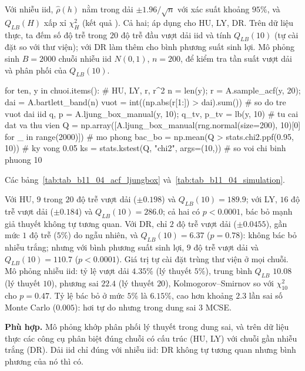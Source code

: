  Với nhiễu iid, $\hat\rho(h)$ nằm trong dải $\pm1.96/\sqrt n$ với xác suất khoảng $95\%$, và $Q_{LB}(H)$ xấp xỉ $\chi^2_H$ (kết quả ).
 Cả hai; áp dụng cho HU, LY, DR. Trên dữ liệu thực, ta đếm số độ trễ trong $20$ độ trễ đầu vượt dải iid và tính $Q_{LB}(10)$ (tự cài đặt so với thư viện); với DR làm thêm cho bình phương suất sinh lợi. Mô phỏng sinh $B=2000$ chuỗi nhiễu iid $N(0,1)$, $n=200$, để kiểm tra tần suất vượt dải và phân phối của $Q_{LB}(10)$.
\begin{codeblock}
for ten, y in chuoi.items():                 # HU, LY, r, r^2
    n = len(y); r = A.sample_acf(y, 20); dai = A.bartlett_band(n)
    vuot = int((np.abs(r[1:]) > dai).sum())              # so do tre vuot dai iid
    q, p = A.ljung_box_manual(y, 10); q_tv, p_tv = lb(y, 10)   # tu cai dat va thu vien
Q = np.array([A.ljung_box_manual(rng.normal(size=200), 10)[0] for _ in range(2000)])   # mo phong
bac_bo = np.mean(Q > stats.chi2.ppf(0.95, 10))           # ky vong 0.05
ks = stats.kstest(Q, "chi2", args=(10,))                 # so voi chi binh phuong 10
\end{codeblock}
 Các bảng~\ref{tab:tab_b11_04_acf_ljungbox} và~\ref{tab:tab_b11_04_simulation}.


 Với HU, $9$ trong $20$ độ trễ vượt dải ($\pm0.198$) và $Q_{LB}(10)=189.9$; với LY, $16$ độ trễ vượt dải ($\pm0.184$) và $Q_{LB}(10)=286.0$; cả hai có $p<0.0001$, bác bỏ mạnh giả thuyết không tự tương quan. Với DR, chỉ $2$ độ trễ vượt dải ($\pm0.0455$), gần mức $1$ độ trễ ($5\%$) do ngẫu nhiên, và $Q_{LB}(10)=6.37$ ($p=0.78$): không bác bỏ nhiễu trắng; nhưng với bình phương suất sinh lợi, $9$ độ trễ vượt dải và $Q_{LB}(10)=110.7$ ($p<0.0001$). Giá trị tự cài đặt trùng thư viện ở mọi chuỗi. Mô phỏng nhiễu iid: tỷ lệ vượt dải $4.35\%$ (lý thuyết $5\%$), trung bình $Q_{LB}$ $10.08$ (lý thuyết $10$), phương sai $22.4$ (lý thuyết $20$), Kolmogorov--Smirnov so với $\chi^2_{10}$ cho $p=0.47$. Tỷ lệ bác bỏ ở mức $5\%$ là $6.15\%$, cao hơn khoảng $2.3$ lần sai số Monte Carlo ($0.005$): hơi tự do nhưng trong dung sai $3$ MCSE.

 \textbf{Phù hợp.} Mô phỏng khớp phân phối lý thuyết trong dung sai, và trên dữ liệu thực các công cụ phân biệt đúng chuỗi có cấu trúc (HU, LY) với chuỗi gần nhiễu trắng (DR). Dải iid chỉ đúng với nhiễu iid: DR không tự tương quan nhưng bình phương của nó thì có.

